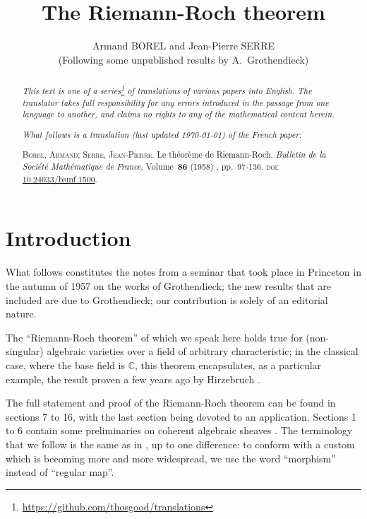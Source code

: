 \documentclass{article}
\theoremstyle{plain}
\theoremstyle{definition}
\newcommand{\oldpage}[1]{\marginpar{\footnotesize$\Big\vert$ \textit{p.~#1}}}
\begin{document}
\renewcommand{\abstractname}{Translator's note.}

\title{The Riemann-Roch theorem}
\author{Armand BOREL and Jean-Pierre SERRE\\(Following some unpublished results by A.~Grothendieck)}
\date{}
\maketitle

\begin{abstract}
  \renewcommand*{\thefootnote}{\fnsymbol{footnote}}
  \emph{This text is one of a series\footnote{\url{https://github.com/thosgood/translations}} of translations of various papers into English.}
  \emph{The translator takes full responsibility for any errors introduced in the passage from one language to another, and claims no rights to any of the mathematical content herein.}
  
  \emph{What follows is a translation (last updated \today) of the French paper:}

  \medskip\noindent
  \textsc{Borel, Armand}; \textsc{Serre, Jean-Pierre}. Le th\'{e}or\`{e}me de Riemann-Roch. \emph{Bulletin de la Soci\'{e}t\'{e} Math\'{e}matique de France}, Volume~\textbf{86} (1958) , pp.~97-136. \textsc{doi}: \href{https://www.doi.org/10.24033/bsmf.1500}{10.24033/bsmf.1500}.
\end{abstract}

\setcounter{footnote}{0}

\tableofcontents



\section*{Introduction}

\oldpage{97}
What follows constitutes the notes from a seminar that took place in Princeton in the autumn of 1957 on the works of Grothendieck;
the new results that are included are due to Grothendieck;
our contribution is solely of an editorial nature.

The ``Riemann-Roch theorem'' of which we speak here holds true for (non-singular) algebraic varieties over a field of arbitrary characteristic;
in the classical case, where the base field is $\mathbb{C}$, this theorem encapsulates, as a particular example, the result proven a few years ago by Hirzebruch \cite{9}.

The full statement and proof of the Riemann-Roch theorem can be found in sections 7 to 16, with the last section being devoted to an application.
Sections 1 to 6 contain some preliminaries on coherent algebraic sheaves \cite{12}.
The terminology that we follow is the same as in \cite{12}, up to one difference: to conform with a custom which is becoming more and more widespread, we use the word ``morphism'' instead of ``regular map''.
\end{document}

